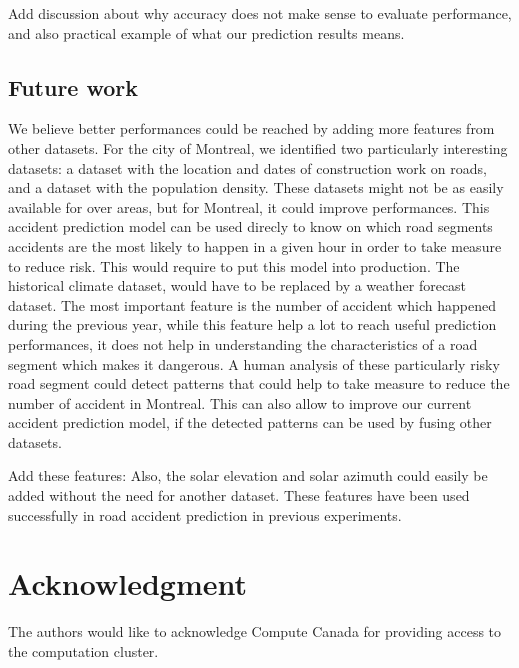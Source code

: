 \documentclass[conference]{IEEEtran}
\begin{document}
Add discussion about why accuracy does not make sense to evaluate performance, and also practical example of what our prediction results means.

\subsection{Future work}
We believe better performances could be reached by adding more features from other datasets.
For the city of Montreal, we identified two particularly interesting datasets: a dataset with the location and dates of construction work on roads, and a dataset with the population density.
These datasets might not be as easily available for over areas, but for Montreal, it could improve performances.
This accident prediction model can be used direcly to know on which road segments accidents are the most likely to happen in a given hour in order to take measure to reduce risk.
This would require to put this model into production.
The historical climate dataset, would have to be replaced by a weather forecast dataset.
The most important feature is the number of accident which happened during the previous year, while this feature help a lot to reach useful prediction performances, it does not help in understanding the characteristics of a road segment which makes it dangerous.
A human analysis of these particularly risky road segment could detect patterns that could help to take measure to reduce the number of accident in Montreal.
This can also allow to improve our current accident prediction model, if the detected patterns can be used by fusing other datasets.

Add these features:
Also, the solar elevation and solar azimuth could easily be added without the need for another dataset.
These features have been used successfully in road accident prediction in previous experiments.

\section*{Acknowledgment}

The authors would like to acknowledge Compute Canada for providing access to the computation cluster.



\end{document}
